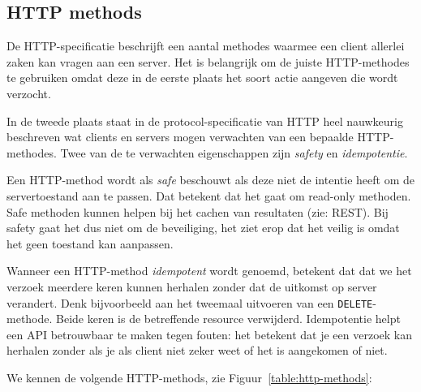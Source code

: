 \subsection{HTTP methods}
De HTTP-specificatie beschrijft een aantal methodes 
waarmee een client allerlei zaken kan vragen aan een server.
Het is belangrijk om de juiste HTTP-methodes te gebruiken omdat 
deze in de eerste plaats het soort actie aangeven die wordt verzocht.

In de tweede plaats staat in de protocol-specificatie van HTTP heel 
nauwkeurig beschreven wat clients en servers mogen verwachten van een 
bepaalde HTTP-methodes. 
Twee van de te verwachten eigenschappen zijn \textit{safety}
en \textit{idempotentie}.

Een HTTP-method wordt als \textit{safe} beschouwt als deze niet 
de intentie heeft om de servertoestand aan te passen. 
Dat betekent dat het gaat om read-only methoden. Safe 
methoden kunnen helpen bij het cachen van resultaten (zie: REST).
Bij safety gaat het dus niet om de beveiliging, het ziet 
erop dat het veilig is omdat het geen toestand kan aanpassen.

Wanneer een HTTP-method \textit{idempotent} wordt genoemd,
betekent dat dat we het verzoek meerdere keren kunnen herhalen
zonder dat de uitkomst op server verandert. Denk bijvoorbeeld aan 
het tweemaal uitvoeren van een \texttt{DELETE}-methode. Beide keren is 
de betreffende resource verwijderd. Idempotentie helpt een API betrouwbaar 
te maken tegen fouten: het betekent dat je een verzoek kan herhalen zonder 
als je als client niet zeker weet of het is aangekomen of niet.

We kennen de volgende HTTP-methods, zie Figuur~\ref{table:http-methods}:


